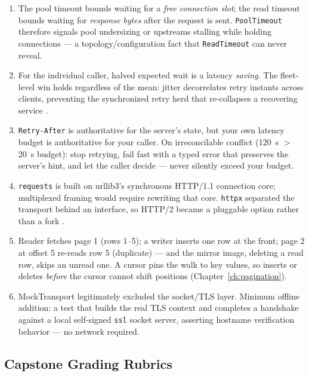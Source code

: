 \begin{enumerate}[leftmargin=2.2em]
  \item The pool timeout bounds waiting for a \emph{free connection slot};
    the read timeout bounds waiting for \emph{response bytes} after the
    request is sent. \texttt{PoolTimeout} therefore signals pool
    undersizing or upstreams stalling while holding connections --- a
    topology/configuration fact that \texttt{ReadTimeout} can never reveal.
  \item For the individual caller, halved expected wait is a latency
    \emph{saving}. The fleet-level win holds regardless of the mean:
    jitter decorrelates retry instants across clients, preventing the
    synchronized retry herd that re-collapses a recovering service
    \cite{nygard2018releaseit}.
  \item \texttt{Retry-After} is authoritative for the server's state, but
    your own latency budget is authoritative for your caller. On
    irreconcilable conflict (120~s $>$ 20~s budget): stop retrying, fail
    fast with a typed error that preserves the server's hint, and let the
    caller decide --- never silently exceed your budget.
  \item \texttt{requests} is built on urllib3's synchronous HTTP/1.1
    connection core; multiplexed framing would require rewriting that core.
    \texttt{httpx} separated the transport behind an interface, so HTTP/2
    became a pluggable option rather than a fork
    \cite{httpxdocs, requestsdocs}.
  \item Reader fetches page 1 (rows 1--5); a writer inserts one row at the
    front; page 2 at offset 5 re-reads row 5 (duplicate) --- and the mirror
    image, deleting a read row, skips an unread one. A cursor pins the walk
    to key values, so inserts or deletes \emph{before} the cursor cannot
    shift positions (Chapter~\ref{ch:pagination}).
  \item MockTransport legitimately excluded the socket/TLS layer. Minimum
    offline addition: a test that builds the real TLS context and completes
    a handshake against a local self-signed \texttt{ssl} socket server,
    asserting hostname verification behavior --- no network required.
\end{enumerate}

\subsection{Capstone Grading Rubrics}

